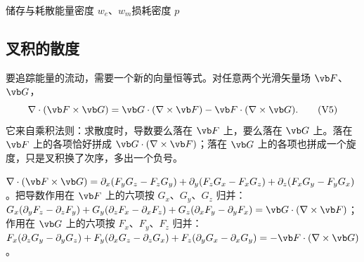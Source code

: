 \begin{compare}{储存与耗散}{能量密度 $w_e$、$w_m$}{损耗密度 $p$}
\end{compare}

\subsection{叉积的散度}
要追踪能量的流动，需要一个新的向量恒等式。对任意两个光滑矢量场 $\vb F$、$\vb G$，
\begin{equation}
\nabla\cdot(\vb F\times\vb G)=\vb G\cdot(\nabla\times\vb F)-\vb F\cdot(\nabla\times\vb G).
\tag{V5}\label{id:crossdiv}
\end{equation}
它来自乘积法则：求散度时，导数要么落在 $\vb F$ 上，要么落在 $\vb G$ 上。落在 $\vb F$ 上的各项恰好拼成 $\vb G\cdot(\nabla\times\vb F)$；落在 $\vb G$ 上的各项也拼成一个旋度，只是叉积换了次序，多出一个负号。

\begin{deeper}
$\nabla\cdot(\vb F\times\vb G)=\partial_x(F_yG_z-F_zG_y)+\partial_y(F_zG_x-F_xG_z)+\partial_z(F_xG_y-F_yG_x)$。把导数作用在 $\vb F$ 上的六项按 $G_x$、$G_y$、$G_z$ 归并：
$G_x(\partial_yF_z-\partial_zF_y)+G_y(\partial_zF_x-\partial_xF_z)+G_z(\partial_xF_y-\partial_yF_x)=\vb G\cdot(\nabla\times\vb F)$；
作用在 $\vb G$ 上的六项按 $F_x$、$F_y$、$F_z$ 归并：
$F_x(\partial_zG_y-\partial_yG_z)+F_y(\partial_xG_z-\partial_zG_x)+F_z(\partial_yG_x-\partial_xG_y)=-\vb F\cdot(\nabla\times\vb G)$。
\end{deeper}


